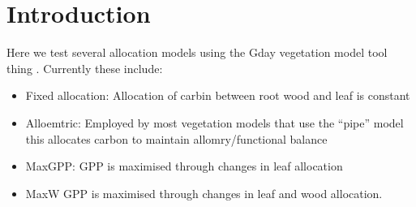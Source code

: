\chapter{Introduction}

Here we test several allocation models using the Gday vegetation model tool thing \citep{Comins1993,Corbeels2005}. Currently these include:

\begin{itemize}
	\item Fixed allocation: Allocation of carbin between root wood and leaf is constant
	\item Alloemtric: Employed by most vegetation models that use the ``pipe'' model this allocates carbon to maintain allomry/functional balance
	\item MaxGPP: GPP is maximised through changes in leaf allocation
	\item MaxW GPP is maximised through changes in leaf and wood allocation.
\end{itemize}
